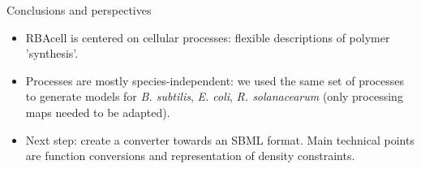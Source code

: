 \documentclass{beamer}
\begin{document}
\begin{frame}{Conclusions and perspectives}
  \begin{itemize}
    \item RBAcell is centered on cellular processes: flexible descriptions
    of polymer 'synthesis'.
    \item Processes are mostly species-independent: we used the same set of processes to
    generate models for \textit{B. subtilis}, \textit{E. coli}, \textit{R. solanacearum}
    (only processing maps needed to be adapted).
    \item Next step: create a converter towards an SBML format.
    Main technical points are function conversions and representation of density constraints.
  \end{itemize}
\end{frame}

\appendix
{}
\setcounter{finalframe}{\value{framenumber}}


\setcounter{framenumber}{\value{finalframe}}
\end{document}
